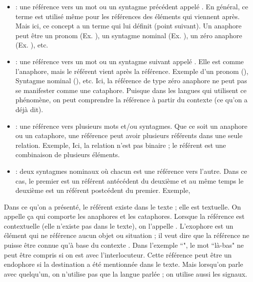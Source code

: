 \documentclass{KodeBook}
\begin{document}
\begin{itemize}
	\item {} : une référence vers un mot ou un syntagme précédent appelé .
	En général, ce terme est utilisé même pour les références des éléments qui viennent après. 
	Mais ici, ce concept a un terme qui lui définit (point suivant).
	Un anaphore peut être un pronom (Ex. ), un syntagme nominal (Ex. ), un zéro anaphore (Ex. ), etc.
	
	\item {} : une référence vers un mot ou un syntagme suivant appelé .
	Elle est comme l'anaphore, mais le référent vient après la référence. 
	Exemple d'un pronom (), Syntagme nominal (), etc. 
	Ici, la référence de type zéro anaphore ne peut pas se manifester comme une cataphore. 
	Puisque dans les langues qui utilisent ce phénomène, on peut comprendre la référence à partir du contexte (ce qu'on a déjà dit).
	
	\item {} : une référence vers plusieurs mots et/ou syntagmes.
	Que ce soit un anaphore ou un cataphore, une référence peut avoir plusieurs référents dans une seule relation.
	Exemple, 
	Ici, la relation n'est pas binaire ; le référent est une combinaison de plusieurs éléments. 
	
	\item {} : deux syntagmes nominaux où chacun est une référence vers l'autre. 
	Dans ce cas, le premier est un référent antécédent du deuxième et au même temps le deuxième est un référent postcédent du premier.  
	Exemple, 
	
\end{itemize}

Dans ce qu'on a présenté, le référent existe dans le texte ; elle est textuelle. 
On appelle ça  qui comporte les anaphores et les cataphores. 
Lorsque la référence est contextuelle (elle n'existe pas dans le texte), on l'appelle .
L'exophore est un élément qui ne référence aucun objet ou situation ; il veut dire que la référence ne puisse être connue qu'à base du contexte \cite{2014-halliday-hasan}. 
Dans l'exemple ``", le mot ``là-bas" ne peut être compris si on est avec l'interlocuteur. 
Cette référence peut être un endophore si la destination a été mentionnée dans le texte. 
Mais lorsqu'on parle avec quelqu'un, on n'utilise pas que la langue parlée ; on utilise aussi les signaux.
\end{document}
